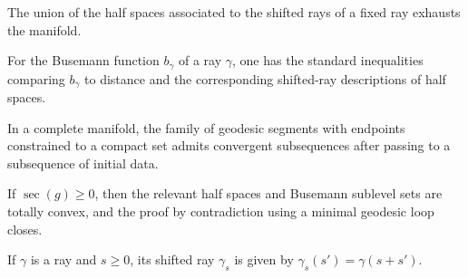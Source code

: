 \begin{lemma}
\label{appb-lem-halfspace-exhaustion}
The union of the half spaces associated to the shifted rays of a fixed ray exhausts the manifold.
\end{lemma}

\begin{lemma}
\label{appb-lem-busemann-basic}
For the Busemann function $b_\gamma$ of a ray $\gamma$, one has the standard inequalities comparing $b_\gamma$ to distance and the corresponding shifted-ray descriptions of half spaces.
\end{lemma}

\begin{lemma}
\label{appb-lem-compactness-geodesic-segments}
In a complete manifold, the family of geodesic segments with endpoints constrained to a compact set admits convergent subsequences after passing to a subsequence of initial data.
\end{lemma}

\begin{proposition}
\label{appb-prop-nonconvexity-contradiction}
If $\sec(g)\ge 0$, then the relevant half spaces and Busemann sublevel sets are totally convex, and the proof by contradiction using a minimal geodesic loop closes.
\end{proposition}

\begin{definition}
\label{appb-def-shifted-ray}
If $\gamma$ is a ray and $s\ge 0$, its shifted ray $\gamma_s$ is given by $\gamma_s(s')=\gamma(s+s')$.
\end{definition}

